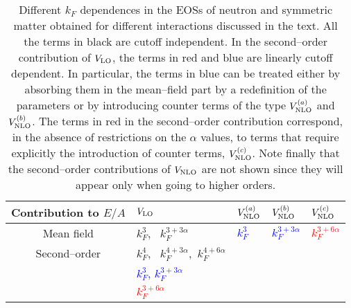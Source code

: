 \documentclass[aps,11pt,prc,preprint,superscriptaddress,nofootinbib]{revtex4}
\begin{document}
\begin{table}[htbp]
\centering%
\begin{tabular}{cllll}
\hline\hline
Contribution to $E/A$ & \hspace*{1.cm} $V_{\rm LO}$  \hspace*{1.cm} & \hspace*{1.cm} $V^{(a)}_{\rm NLO}$ \hspace*{1.cm}&
\hspace*{1.cm}  $V^{(b)}_{\rm NLO}$  \hspace*{1.cm} & \hspace*{1.cm} $V^{(c)}_{\rm NLO}$ \hspace*{1.cm}
 \\ \hline
 Mean field &  \hspace*{1.cm} $ k^{3}_F$, ~$k^{3+3\alpha}_F$ &  \hspace*{1.cm} \textcolor{blue}{$ k^{3}_F$} 
 & \hspace*{1.cm} \textcolor{blue}{$ k^{3+3\alpha}_F$}  
 & \hspace*{1.cm}  \textcolor{red}{$k^{3+6\alpha}_F$}   \\ \hline
 Second--order &  \hspace*{1.cm} $k^{4}_F$, ~$k^{4+3\alpha}_F$,~$k^{4+6\alpha}_F$ \\
 & \hspace*{1.cm} \textcolor{blue}{$ k^{3}_F$,  $ k^{3+3\alpha}_F$} \\
 &  \hspace*{1.cm} \textcolor{red}{$k^{3+6\alpha}_F$}
  \\ \hline\hline
\end{tabular}%
\caption{Different $k_F$ 
 dependences in the EOSs of neutron and symmetric matter obtained for different interactions discussed in the text. All the terms in black are cutoff independent. In the second--order contribution of $V_{\rm LO}$, the terms in red and blue are linearly cutoff dependent. 
In particular, the terms in blue 
can be treated either by absorbing them in the mean--field part by a redefinition of the 
parameters or 
by introducing counter terms of the type $V_{\rm NLO}^{(a)}$ and $V_{\rm NLO}^{(b)}$. The terms in red in the second--order contribution correspond, in the absence of restrictions on the $\alpha$ values, to terms that require explicitly the introduction of counter terms, $V_{\rm NLO}^{(c)}$. 
 Note finally that the second--order contributions of $V_{\rm NLO}$
are not shown since they will appear only when going to higher orders. }
\label{kflambda}
\end{table} 
\end{document}
